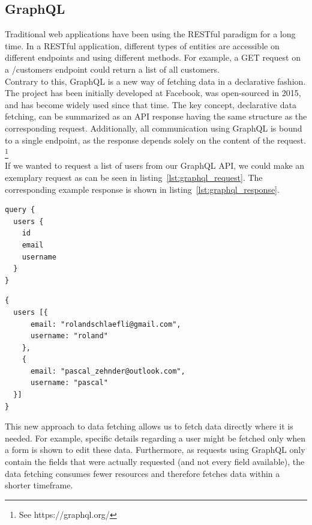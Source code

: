 \subsection{GraphQL}

Traditional web applications have been using the RESTful paradigm for a long time. In a RESTful application, different types of entities are accessible on different endpoints and using different methods. For example, a GET request on a /customers endpoint could return a list of all customers.\\

Contrary to this, GraphQL is a new way of fetching data in a declarative fashion. The project has been initially developed at Facebook, was open-sourced in 2015, and has become widely used since that time. The key concept, declarative data fetching, can be summarized as an API response having the same structure as the corresponding request. Additionally, all communication using GraphQL is bound to a single endpoint, as the response depends solely on the content of the request. \footnote{See https://graphql.org/}\\

If we wanted to request a list of users from our GraphQL API, we could make an exemplary request as can be seen in listing~\ref{lst:graphql_request}. The corresponding example response is shown in listing~\ref{lst:graphql_response}.

\begin{multicols}{2}
  \vspace*{\fill}
  \begin{lstlisting}[caption=GraphQL request, label=lst:graphql_request]
query {
  users {
    id
    email
    username
  }
}
  \end{lstlisting}
  \columnbreak
  \begin{lstlisting}[caption=GraphQL response, label=lst:graphql_response]
{
  users [{
      email: "rolandschlaefli@gmail.com",
      username: "roland"
    },
    {
      email: "pascal_zehnder@outlook.com",
      username: "pascal"
  }]
}
  \end{lstlisting}
\end{multicols}

This new approach to data fetching allows us to fetch data directly where it is needed. For example, specific details regarding a user might be fetched only when a form is shown to edit these data. Furthermore, as requests using GraphQL only contain the fields that were actually requested (and not every field available), the data fetching consumes fewer resources and therefore fetches data within a shorter timeframe.


